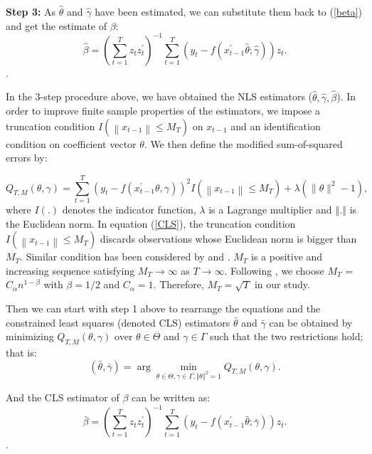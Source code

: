 \documentclass[a4paper,12pt,times,numbered,print,index]{report}
\numberwithin{equation}{section}
\begin{document}
\textbf{Step 3: } As $\hat{\theta}$ and $\hat{\gamma}$ have been estimated, we can substitute them back to (\ref{beta}) and get the estimate of $\beta$:
$$
 \hat{\beta} = \left( \sum_{t=1}^{T}z_t z_t^{\prime}\right)^{-1}\sum_{t=1}^{T}\left( y_t- f\left( x_{t-1}^{\prime }\hat{\theta}; \hat{\gamma}\right)\right) z_t.
$$.

In the 3-step procedure above, we have obtained the NLS estimators ($\widehat{\theta}, \widehat{\gamma}, \widehat{\beta}$). In order to improve finite sample properties of the estimators, we impose a truncation condition $I\left(\left\|x_{t-1}\right\| \leq M_T\right)$ on $x_{t-1}$ and an identification condition on coefficient vector $\theta$. We then define the modified sum-of-squared errors by:

\begin{equation}
	Q_{T, M}(\theta, \gamma)=\sum_{t=1}^{T}\left(y_{t}-f\left(x_{t-1}^{\prime} \theta, \gamma\right)\right)^{2} I\left(\left\|x_{t-1}\right\| \leq M_{T}\right)+\lambda\left(\|\theta\|^{2}-1\right),
	\label{CLS}
\end{equation}
where $I\left( .\right) $ denotes the indicator function, $\lambda $ is a Lagrange
multiplier and $\left\Vert .\right\Vert $ is the Euclidean norm. In equation (\ref{CLS}), the truncation condition $I\left(\left\|x_{t-1}\right\| \leq M_{T}\right)$ discards observations whose Euclidean norm is bigger than $M_T$. Similar condition has been considered by \cite{li2016estimation} and \cite{ling2007self}. $M_T$ is a positive and increasing sequence satisfying $ M_{T}\rightarrow \infty $ as $T \rightarrow \infty $. Following \cite{li2016estimation}, we choose $M_T$ = $C_{\alpha}n^{1-\beta}$ with $\beta = 1/2$ and $C_{\alpha} = 1$. Therefore, $M_T = \sqrt{T}$ in our study.    

Then we can start with step 1 above to rearrange the equations and the constrained least squares (denoted CLS) estimators $\bar{\theta}$ and $%
\bar{\gamma}$ can be obtained by minimizing $Q_{T,M}\left( \theta ,\gamma \right) 
$ over $\theta \in \Theta $ and $\gamma \in \Gamma $ such that the
two restrictions hold; that is:%
\begin{equation*}
\left( \bar{\theta},\bar{\gamma}\right) =\arg \min_{\theta \in \Theta
	,\gamma \in \Gamma ,\left\Vert \theta \right\Vert ^{2}=1}Q_{T,M}\left(
\theta ,\gamma \right) .  \label{cls_c3}
\end{equation*}%

And the CLS estimator of $\beta$ can be written as:
$$
\bar{\beta} = \left( \sum_{t=1}^{T}z_t z_t^{\prime}\right)^{-1}\sum_{t=1}^{T}\left( y_t- f\left( x_{t-1}^{\prime }\bar{\theta}; \bar{\gamma}\right)\right) z_t.
$$.
\end{document}
